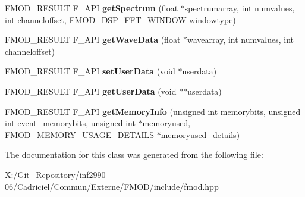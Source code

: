 \begin{DoxyCompactItemize}
\item 
\hypertarget{class_f_m_o_d_1_1_channel_group_a8ee0bad7f2c729641b5d61f2f2aff135}{F\-M\-O\-D\-\_\-\-R\-E\-S\-U\-L\-T F\-\_\-\-A\-P\-I {\bfseries get\-Spectrum} (float $\ast$spectrumarray, int numvalues, int channeloffset, F\-M\-O\-D\-\_\-\-D\-S\-P\-\_\-\-F\-F\-T\-\_\-\-W\-I\-N\-D\-O\-W windowtype)}\label{class_f_m_o_d_1_1_channel_group_a8ee0bad7f2c729641b5d61f2f2aff135}

\item 
\hypertarget{class_f_m_o_d_1_1_channel_group_a8d632fabc33cc9f67e528c76489c9172}{F\-M\-O\-D\-\_\-\-R\-E\-S\-U\-L\-T F\-\_\-\-A\-P\-I {\bfseries get\-Wave\-Data} (float $\ast$wavearray, int numvalues, int channeloffset)}\label{class_f_m_o_d_1_1_channel_group_a8d632fabc33cc9f67e528c76489c9172}

\item 
\hypertarget{class_f_m_o_d_1_1_channel_group_a0a71472fd896173cae99c4d2c42743df}{F\-M\-O\-D\-\_\-\-R\-E\-S\-U\-L\-T F\-\_\-\-A\-P\-I {\bfseries set\-User\-Data} (void $\ast$userdata)}\label{class_f_m_o_d_1_1_channel_group_a0a71472fd896173cae99c4d2c42743df}

\item 
\hypertarget{class_f_m_o_d_1_1_channel_group_a347e86f79b6679e20b4515846644e8a4}{F\-M\-O\-D\-\_\-\-R\-E\-S\-U\-L\-T F\-\_\-\-A\-P\-I {\bfseries get\-User\-Data} (void $\ast$$\ast$userdata)}\label{class_f_m_o_d_1_1_channel_group_a347e86f79b6679e20b4515846644e8a4}

\item 
\hypertarget{class_f_m_o_d_1_1_channel_group_a8483ad1631034c7be3fdcf0a9633bbb7}{F\-M\-O\-D\-\_\-\-R\-E\-S\-U\-L\-T F\-\_\-\-A\-P\-I {\bfseries get\-Memory\-Info} (unsigned int memorybits, unsigned int event\-\_\-memorybits, unsigned int $\ast$memoryused, \hyperlink{struct_f_m_o_d___m_e_m_o_r_y___u_s_a_g_e___d_e_t_a_i_l_s}{F\-M\-O\-D\-\_\-\-M\-E\-M\-O\-R\-Y\-\_\-\-U\-S\-A\-G\-E\-\_\-\-D\-E\-T\-A\-I\-L\-S} $\ast$memoryused\-\_\-details)}\label{class_f_m_o_d_1_1_channel_group_a8483ad1631034c7be3fdcf0a9633bbb7}

\end{DoxyCompactItemize}


The documentation for this class was generated from the following file\-:\begin{DoxyCompactItemize}
\item 
X\-:/\-Git\-\_\-\-Repository/inf2990-\/06/\-Cadriciel/\-Commun/\-Externe/\-F\-M\-O\-D/include/fmod.\-hpp\end{DoxyCompactItemize}
